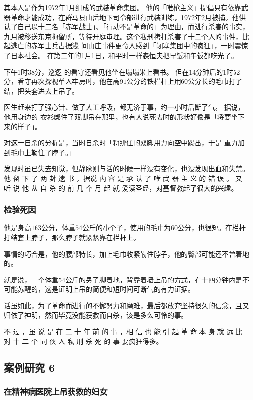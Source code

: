 \documentclass[UTF8]{ctexart}
\begin{document}
其本人是作为1972年1月组成的武装革命集团。
他的「唯枪主义」提倡只有依靠武器革命才能成功，在群马县山岳地下司令部进行武装训练，1972年2月被捕。他供认了自己以十二名「赤军战士」、「行动不是革命的」为理由，而进行杀害的事实，九月被移送东京拘留所，等待开庭审理。这个私刑拷打杀害了十二个人的事件，比起逃亡的赤军士兵占据浅 间山庄事件更令人感到「闭塞集团中的疯狂」，一时震惊了日本社会。 在第二年的1月1日，和平时一样森恒夫把早饭和午饭都吃光了。

下午1时38分，巡逻 的看守还看见他坐在塌塌米上看书。
但在$14$分钟后的1时52分，看守再次探视单人牢房时，他在高$91$公分的铁栏杆上用$60$公分长的毛巾打了结，把头套进去上吊了。

医生赶来打了强心针、做了人工呼吸，都无济于事，约一小时后断了气。
据说，他用身边的 衣衫绑住了双脚吊在那里，也有人说死去时的形状好像是「将要坐下来的样子」。

对这一自杀的分析是，当时自杀时「将绑住的双脚用力向空中踢出，于是 重力加到毛巾上勒住了脖子。」

发现时虽已失去知觉，但静脉则与活的时候一样没有变化，也没发现出血和失禁。 
他 留 下 了 两 封 遗 书 ，据说 内 容 是 承 认 了 唯 武 器 主 义 的 错 误 。
又 听 说 他 从 自 杀 的 前 几 个 月 起 就 爱读圣经，对基督教起了很大的兴趣。

\subsubsection*{检验死因}

他是身高$163$公分，体重$54$公斤的小个子，使用的毛巾为$60$公分，也很短。在栏杆打结套上脖子，那么脖子就紧紧靠在栏杆上。

事情的巧合是，他的腰部特长，加上毛巾收紧勒住脖子，他的臀部可能还不曾着地的。

就是说，一个体重$54$公斤的男子脚着地，背靠着墙上吊的方式，在十四分钟内是不可能苏醒的，这是证明上吊的简便和短时间可断气的有力证据。

话虽如此，为了革命而进行的不懈努力和磨难，最后都放弃坚持很久的信念，且又归依了神明，然而毕竟没能获救而自杀，该是多么可怜的事。

不 过 ，虽 说 是 在 二 十 年 前 的 事 ，相 信 也 能 引 起 革 命 本 身 就 远 比 对 十 二 个 同 伙 人 私 刑 杀 死 的 事 要疯狂得多。

\subsection{案例研究 6}
\subsubsection*{在精神病医院上吊获救的妇女}
\end{document}
